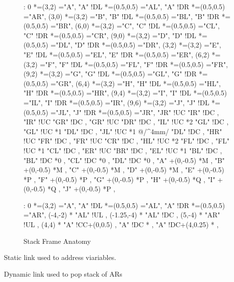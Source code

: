 \documentclass[a4paper,12pt]{article}
\begin{document}
\begin{figure}[h]

\xy<1cm,0cm>:
0 *=(3,2)\frm{-} ="A",
"A" !DL *=(0.5,0.5)\frm{-} ="AL",
"A" !DR *=(0.5,0.5)\frm{-} ="AR",
(3,0) *=(3,2)\frm{-} ="B",
"B" !DL *=(0.5,0.5)\frm{-} ="BL",
"B" !DR *=(0.5,0.5)\frm{-} ="BR",
(6,0) *=(3,2)\frm{-} ="C",
"C" !DL *=(0.5,0.5)\frm{-} ="CL",
"C" !DR *=(0.5,0.5)\frm{-} ="CR",
(9,0) *=(3,2)\frm{-} ="D",
"D" !DL *=(0.5,0.5)\frm{-} ="DL",
"D" !DR *=(0.5,0.5)\frm{-} ="DR",
%
(3,2) *=(3,2)\frm{-} ="E",
"E" !DL *=(0.5,0.5)\frm{-} ="EL",
"E" !DR *=(0.5,0.5)\frm{-} ="ER",
(6,2) *=(3,2)\frm{-} ="F",
"F" !DL *=(0.5,0.5)\frm{-} ="FL",
"F" !DR *=(0.5,0.5)\frm{-} ="FR",
(9,2) *=(3,2)\frm{-} ="G",
"G" !DL *=(0.5,0.5)\frm{-} ="GL",
"G" !DR *=(0.5,0.5)\frm{-} ="GR",
%
(6,4) *=(3,2)\frm{-} ="H",
"H" !DL *=(0.5,0.5)\frm{-} ="HL",
"H" !DR *=(0.5,0.5)\frm{-} ="HR",
(9,4) *=(3,2)\frm{-} ="I",
"I" !DL *=(0.5,0.5)\frm{-} ="IL",
"I" !DR *=(0.5,0.5)\frm{-} ="IR",
%
(9,6) *=(3,2)\frm{-} ="J",
"J" !DL *=(0.5,0.5)\frm{-} ="JL",
"J" !DR *=(0.5,0.5)\frm{-} ="JR",
%
\POS "JR" !UC \ar "IR" !DC ,
\POS "IR" !UC \ar "GR" !DC ,
\POS "GR" !UC \ar "DR" !DC ,
\POS "IL" !UC *{2} \ar "GL" !DC ,
\POS "GL" !UC *{1} \ar "DL" !DC ,
\POS "JL" !UC *{1} \ar @/^4mm/ "DL" !DC ,
\POS "HR" !UC \ar "FR" !DC ,
\POS "FR" !UC \ar "CR" !DC ,
\POS "HL" !UC *{2} \ar "FL" !DC ,
\POS "FL" !UC *{1} \ar "CL" !DC ,
\POS "ER" !UC \ar "BR" !DC ,
\POS "EL" !UC *{1} \ar "BL" !DC ,
%
\POS "BL" !DC *{0} ,
\POS "CL" !DC *{0} ,
\POS "DL" !DC *{0} ,
%
\POS "A" +(0,-0.5) *{M} ,
\POS "B" +(0,-0.5) *{M} ,
\POS "C" +(0,-0.5) *{M} ,
\POS "D" +(0,-0.5) *{M} ,
\POS "E" +(0,-0.5) *{P} ,
\POS "F" +(0,-0.5) *{P} ,
\POS "G" +(0,-0.5) *{P} ,
\POS "H" +(0,-0.5) *{Q} ,
\POS "I" +(0,-0.5) *{Q} ,
\POS "J" +(0,-0.5) *{P} ,
\endxy

\end{figure}

\vspace{20mm}

\begin{figure}[h]

\xy<1cm,0cm>:
0 *=(3,2)\frm{-} ="A",
"A" !DL *=(0.5,0.5)\frm{-} ="AL",
"A" !DR *=(0.5,0.5)\frm{-} ="AR",
%
\POS (-4,-2) * \ar "AL" !UL ,
\POS (-1.25,-4) * \ar "AL" !DC ,
\POS (5,-4) * \ar "AR" !UL ,
\POS (4,4) * \ar "A" !CC+(0,0.5) ,
\POS "A" !DC * ,
\POS "A" !DC+(4,0.25) * ,
\endxy

\caption{Stack Frame Anatomy}

\end{figure}

Static link used to address viariables.

Dynamic link used to pop stack of ARs
\end{document}
